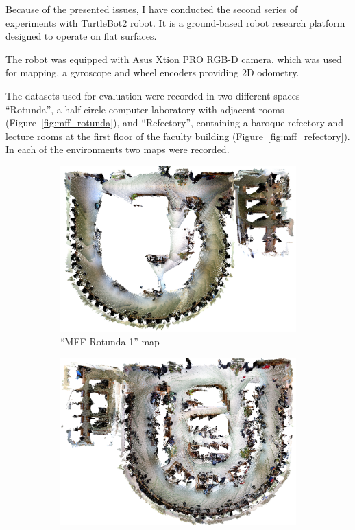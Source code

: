 Because of the presented issues, I have conducted the second series of experiments with TurtleBot2 robot. It is a ground-based robot research platform designed to operate on flat surfaces.

The robot was equipped with Asus Xtion PRO \gls{RGB-D} camera, which was used for mapping, a gyroscope and wheel encoders providing \gls{2D} odometry.

The datasets used for evaluation were recorded in two different spaces ``Rotunda'', a half-circle computer laboratory with adjacent rooms (Figure~\ref{fig:mff_rotunda}), and ``Refectory'', containing a baroque refectory and lecture rooms at the first floor of the faculty building (Figure~\ref{fig:mff_refectory}). In each of the environments two maps were recorded.

\begin{figure}
    \centering
    \begin{subfigure}[b]{\textwidth}
        \includegraphics[width=\textwidth]{../img/mff_rotunda_1.png}
        \caption{``MFF Rotunda 1'' map}
    \end{subfigure}
    \begin{subfigure}[b]{\textwidth}
        \includegraphics[width=\textwidth]{../img/mff_rotunda_2.png}

\end{subfigure}
\end{figure}
